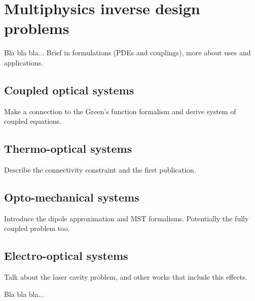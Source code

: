\chapter{Multiphysics inverse design problems}

Bla bla bla... Brief in formulations (PDEs and couplings), more about uses and applications.






\section{Coupled optical systems}

 Make a connection to the Green's function formalism and derive system of coupled equations.

\section{Thermo-optical systems}

Describe the connectivity constraint and the first publication.

\section{Opto-mechanical systems}

Introduce the dipole approximation and MST formalisms. Potentially the fully coupled problem too.

\section{Electro-optical systems}

Talk about the laser cavity problem, and other works that include this effects.


Bla bla bla...